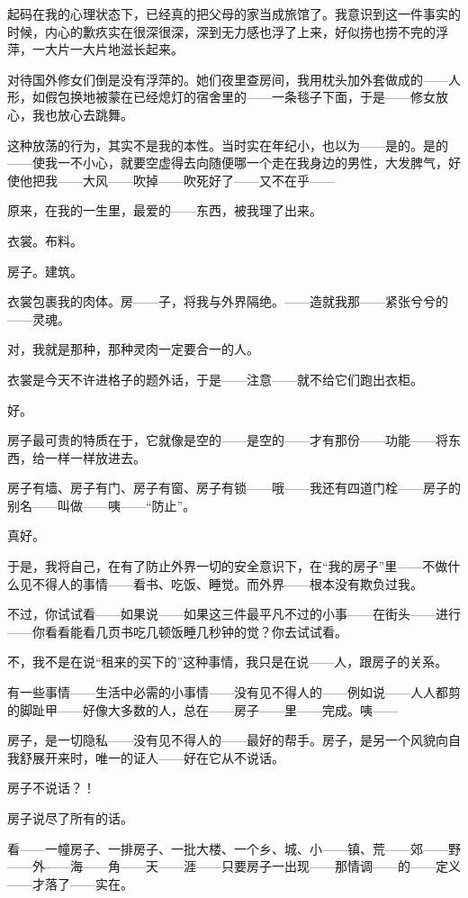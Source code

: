 \par 起码在我的心理状态下，已经真的把父母的家当成旅馆了。我意识到这一件事实的时候，内心的歉疚实在很深很深，深到无力感也浮了上来，好似捞也捞不完的浮萍，一大片一大片地滋长起来。
\par 对待国外修女们倒是没有浮萍的。她们夜里查房间，我用枕头加外套做成的——人形，如假包换地被蒙在已经熄灯的宿舍里的——一条毯子下面，于是——修女放心，我也放心去跳舞。
\par 这种放荡的行为，其实不是我的本性。当时实在年纪小，也以为——是的。是的——使我一不小心，就要空虚得去向随便哪一个走在我身边的男性，大发脾气，好使他把我——大风——吹掉——吹死好了——又不在乎——
\par 原来，在我的一生里，最爱的——东西，被我理了出来。
\par 衣裳。布料。
\par 房子。建筑。
\par 衣裳包裹我的肉体。房——子，将我与外界隔绝。——造就我那——紧张兮兮的——灵魂。
\par 对，我就是那种，那种灵肉一定要合一的人。
\par 衣裳是今天不许进格子的题外话，于是——注意——就不给它们跑出衣柜。
\par 好。
\par 房子最可贵的特质在于，它就像是空的——是空的——才有那份——功能——将东西，给一样一样放进去。
\par 房子有墙、房子有门、房子有窗、房子有锁——哦——我还有四道门栓——房子的别名——叫做——咦——“防止”。
\par 真好。
\par 于是，我将自己，在有了防止外界一切的安全意识下，在“我的房子”里——不做什么见不得人的事情——看书、吃饭、睡觉。而外界——根本没有欺负过我。
\par 不过，你试试看——如果说——如果这三件最平凡不过的小事——在街头——进行——你看看能看几页书吃几顿饭睡几秒钟的觉？你去试试看。
\par 不，我不是在说“租来的买下的”这种事情，我只是在说——人，跟房子的关系。
\par 有一些事情——生活中必需的小事情——没有见不得人的——例如说——人人都剪的脚趾甲——好像大多数的人，总在——房子——里——完成。咦——
\par 房子，是一切隐私——没有见不得人的——最好的帮手。房子，是另一个风貌向自我舒展开来时，唯一的证人——好在它从不说话。
\par 房子不说话？！
\par 房子说尽了所有的话。
\par 看——一幢房子、一排房子、一批大楼、一个乡、城、小——镇、荒——郊——野——外——海——角——天——涯——只要房子一出现——那情调——的——定义——才落了——实在。
